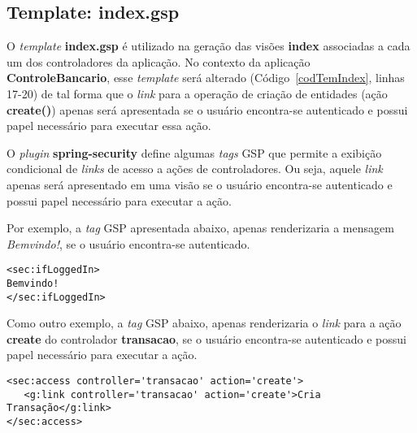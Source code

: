 \subsection{Template: index.gsp}

\vspace{0.5cm}

O {\it template}  {\bf index.gsp} é utilizado na geração  das visões {\bf index}
associadas a cada  um dos controladores da aplicação.   No contexto da aplicação
{\bf     ControleBancario},     esse     {\it    template}     será     alterado
(Código~\ref{codTemIndex}, linhas  17-20) de tal forma  que o {\it  link} para a
operação de criação  de entidades (ação {\bf create()})  apenas será apresentada
se o  usuário encontra-se  autenticado e possui  papel necessário  para executar
essa ação.

O {\it plugin} {\bf spring-security} define algumas {\it tags} GSP que permite a
exibição  condicional de {\it  links} de  acesso a  ações de  controladores.  Ou
seja,  aquele {\it  link} apenas  será  apresentado em  uma visão  se o  usuário
encontra-se autenticado e possui papel necessário para executar a ação.

Por exemplo, a {\it tag}  GSP {\bf <sec: ifLoggedin>} apresentada abaixo, apenas
renderizaria a mensagem {\em Bemvindo!}, se o usuário encontra-se autenticado.

\vspace{0.3cm}

\begin{cBox}
\begin{footnotesize}
\begin{verbatim}
<sec:ifLoggedIn>
Bemvindo!
</sec:ifLoggedIn>
\end{verbatim}
\end{footnotesize}
\end{cBox}

\vspace{0.3cm}

Como  outro  exemplo,  a  {\it  tag}  GSP {\bf  <sec:  access>}  abaixo,  apenas
renderizaria  o  {\it  link}  para  a  ação {\bf  create}  do  controlador  {\bf
  transacao},  se o usuário  encontra-se autenticado  e possui  papel necessário
para executar a ação.  

\vspace{0.3cm}

\begin{cBox}
\begin{footnotesize}
\begin{verbatim}
<sec:access controller='transacao' action='create'>
   <g:link controller='transacao' action='create'>Cria Transação</g:link>
</sec:access>
\end{verbatim}
\end{footnotesize}
\end{cBox}

